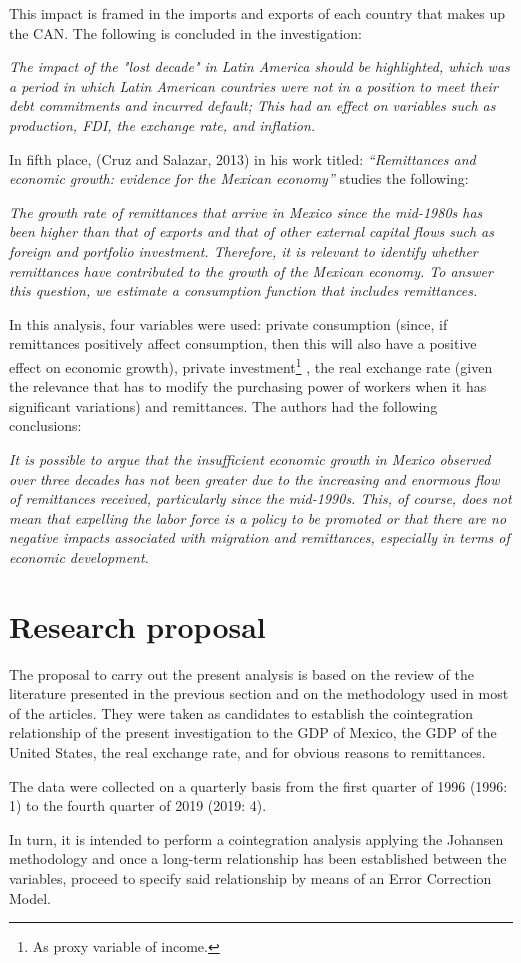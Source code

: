 \documentclass[12pt,english, spanish]{smfart}
\begin{document}
This impact is framed in the imports and exports of each country that makes up the CAN. The following is concluded in the investigation:\par
\textit{The impact of the "lost decade" in Latin America should be highlighted, which was a period in which Latin American countries were not in a position to meet their debt commitments and incurred default; This had an effect on variables such as production, FDI, the exchange rate, and inflation.}	\par
In fifth place, (Cruz and Salazar, 2013) in his work titled: \textit{“Remittances and economic growth: evidence for the Mexican economy”} studies the following:\par
\textit{The growth rate of remittances that arrive in Mexico since the mid-1980s has been higher than that of exports and that of other external capital flows such as foreign and portfolio investment. Therefore, it is relevant to identify whether remittances have contributed to the growth of the Mexican economy. To answer this question, we estimate a consumption function that includes remittances.}\par
In this analysis, four variables were used: private consumption (since, if remittances positively affect consumption, then this will also have a positive effect on economic growth), private investment\footnote{As proxy variable of income.} , the real exchange rate (given the relevance that has to modify the purchasing power of workers when it has significant variations) and remittances. The authors had the following conclusions:\par
\textit{It is possible to argue that the insufficient economic growth in Mexico observed over three decades has not been greater due to the increasing and enormous flow of remittances received, particularly since the mid-1990s. This, of course, does not mean that expelling the labor force is a policy to be promoted or that there are no negative impacts associated with migration and remittances, especially in terms of economic development.}\par

\section{Research proposal}
The proposal to carry out the present analysis is based on the review of the literature presented in the previous section and on the methodology used in most of the articles. They were taken as candidates to establish the cointegration relationship of the present investigation to the GDP of Mexico, the GDP of the United States, the real exchange rate, and for obvious reasons to remittances. \par
The data were collected on a quarterly basis from the first quarter of 1996 (1996: 1) to the fourth quarter of 2019 (2019: 4).\par	
In turn, it is intended to perform a cointegration analysis applying the Johansen methodology and once a long-term relationship has been established between the variables, proceed to specify said relationship by means of an Error Correction Model.\par
\end{document}
